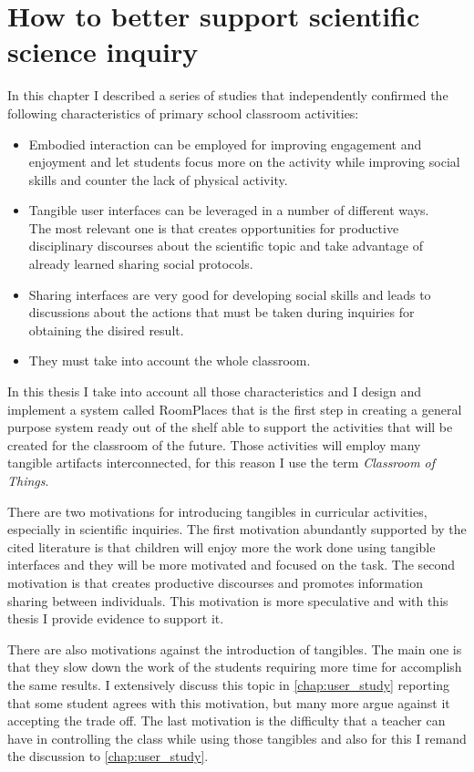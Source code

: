 \section{How to better support scientific science inquiry}
In this chapter I described a series of studies that independently confirmed the following characteristics of primary school classroom activities:
\begin{itemize}
    \item Embodied interaction can be employed for improving engagement and enjoyment and let students focus more on the activity while improving social skills and counter the lack of physical activity.
    \item Tangible user interfaces can be leveraged in a number of different ways.\\ The most relevant one is that creates opportunities for productive disciplinary discourses about the scientific topic and take advantage of already learned sharing social protocols.
    \item Sharing interfaces are very good for developing social skills and leads to discussions about the actions that must be taken during inquiries for obtaining the disired result.
    \item They must take into account the whole classroom.
\end{itemize}
In this thesis I take into account all those characteristics and I design and implement a system called RoomPlaces that is the first step in creating a general purpose system ready out of the shelf able to support the activities that will be created for the classroom of the future. Those activities will employ many tangible artifacts interconnected, for this reason I use the term \textit{Classroom of Things}.

There are two motivations for introducing tangibles in curricular activities, especially in scientific inquiries. The first motivation abundantly supported by the cited literature is that children will enjoy more the work done using tangible interfaces and they will be more motivated and focused on the task. The second motivation is that creates productive discourses and promotes information sharing between individuals. This motivation is more speculative and with this thesis I provide evidence to support it.

There are also motivations against the introduction of tangibles. The main one is that they slow down the work of the students requiring more time for accomplish the same results. I extensively discuss this topic in \autoref{chap:user_study} reporting that some student agrees with this motivation, but many more argue against it accepting the trade off. The last motivation is the difficulty that a teacher can have in controlling the class while using those tangibles and also for this I remand the discussion to \autoref{chap:user_study}.

